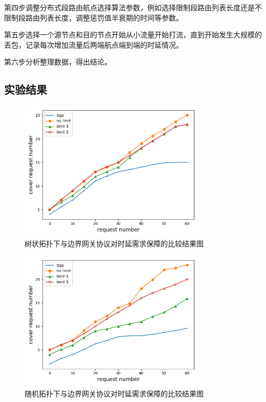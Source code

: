 第四步调整分布式段路由航点选择算法参数，例如选择限制段路由列表长度还是不限制段路由列表长度，调整惩罚值半衰期的时间等参数。

第五步选择一个源节点和目的节点开始从小流量开始打流，直到开始发生大规模的丢包，记录每次增加流量后两端航点端到端的时延情况。

第六步分析整理数据，得出结论。

\subsection{实验结果}

\begin{figure}[htbp]
\setlength{\abovecaptionskip}{15pt plus 3pt minus 2pt}
\centerline{\includegraphics[width=0.8\textwidth]{./figures/ch4-test-tree-topo.png}}
\caption{树状拓扑下与边界网关协议对时延需求保障的比较结果图}
\label{fig-ch4-test-tree-topo}
\end{figure}

\begin{figure}[htbp]
\setlength{\abovecaptionskip}{15pt plus 3pt minus 2pt}
\centerline{\includegraphics[width=0.8\textwidth]{./figures/ch4-test-random-topo.png}}
\caption{随机拓扑下与边界网关协议对时延需求保障的比较结果图}
\label{fig-ch4-test-random-topo}
\end{figure}

